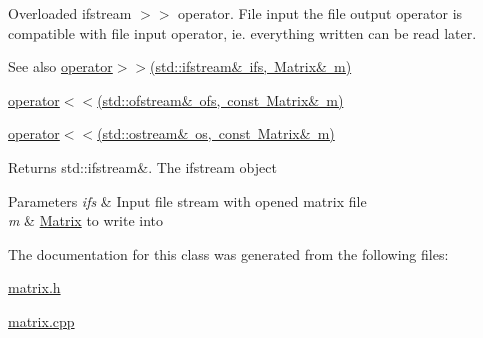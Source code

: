 Overloaded ifstream $>$$>$ operator. File input the file output operator is compatible with file input operator, ie. everything written can be read later. \begin{DoxySeeAlso}{See also}
\mbox{\hyperlink{class_matrix_aa5699a0bdf0ee014f083ff8a76629d21}{operator$>$$>$(std\+::ifstream\& ifs, Matrix\& m)}} 

\mbox{\hyperlink{class_matrix_aa574249d63b390cf1108d6e82047ef61}{operator$<$$<$(std\+::ofstream\& ofs, const Matrix\& m)}} 

\mbox{\hyperlink{class_matrix_a060711074cb5bcaf4e75498bc040c4b7}{operator$<$$<$(std\+::ostream\& os, const Matrix\& m)}} 
\end{DoxySeeAlso}
\begin{DoxyReturn}{Returns}
std\+::ifstream\&. The ifstream object 
\end{DoxyReturn}

\begin{DoxyParams}{Parameters}
{\em ifs} & Input file stream with opened matrix file \\
\hline
{\em m} & \mbox{\hyperlink{class_matrix}{Matrix}} to write into \\
\hline
\end{DoxyParams}


The documentation for this class was generated from the following files\+:\begin{DoxyCompactItemize}
\item 
\mbox{\hyperlink{matrix_8h}{matrix.\+h}}\item 
\mbox{\hyperlink{matrix_8cpp}{matrix.\+cpp}}\end{DoxyCompactItemize}
